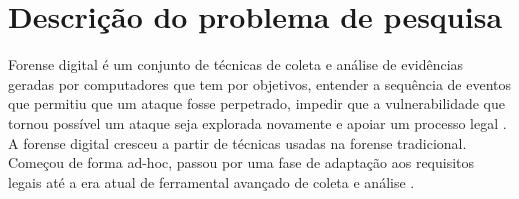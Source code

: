 \documentclass[12pt,				%
	openright,			%
	oneside,			%
	a4paper,			%
	english,			%
	brazil				%
	]{abntex2}
\begin{document}




\textual

\chapter{Descrição do problema de pesquisa} \label{chap:intro}
%
Forense digital é um conjunto de técnicas de coleta e análise de evidências geradas por computadores que tem por objetivos, entender a sequência de eventos que permitiu que um 
ataque fosse perpetrado, impedir que a vulnerabilidade que tornou possível um ataque seja explorada novamente e apoiar um processo legal \cite{Sang2013}. A forense digital 
cresceu a partir de técnicas usadas na forense tradicional. Começou de forma ad-hoc, passou por uma fase de adaptação aos requisitos legais até a era atual de ferramental
avançado de coleta e análise \cite{Charters2008}.
\end{document}
